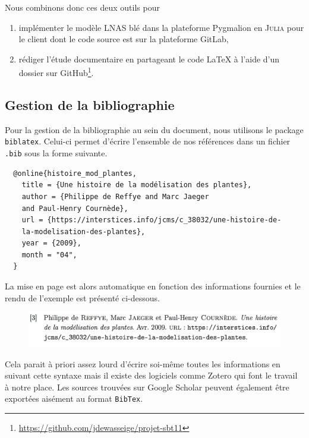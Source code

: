Nous combinons donc ces deux outils pour 
\begin{enumerate}
  \item implémenter le modèle LNAS blé dans la plateforme
  Pygmalion en \textsc{Julia} %
  pour le client dont le code source est sur la plateforme GitLab,
  \item rédiger l'étude documentaire en partageant le code \LaTeX{}
  à l'aide d'un dossier sur 
  GitHub\footnote{\url{https://github.com/jdewasseige/projet-sbt11}}.
\end{enumerate}


\subsection{Gestion de la bibliographie}
Pour la gestion de la bibliographie au sein du document,
nous utilisons le package \texttt{biblatex}.
Celui-ci permet d'écrire l'ensemble de nos références dans un fichier \texttt{.bib}
sous la forme suivante.
\begin{verbatim}
  @online{histoire_mod_plantes,
    title = {Une histoire de la modélisation des plantes},
    author = {Philippe de Reffye and Marc Jaeger 
    and Paul-Henry Cournède},
    url = {https://interstices.info/jcms/c_38032/une-histoire-de-
    la-modelisation-des-plantes},
    year = {2009},
    month = "04",
  }
\end{verbatim}
La mise en page est alors automatique en fonction des informations fournies
et le rendu de l'exemple est présenté ci-dessous.
\begin{figure}[h]
  \includegraphics[scale=0.6]{./img/rendu_elem_bib.jpg}
\end{figure}

Cela parait à priori assez lourd d'écrire soi-même toutes les informations
en suivant cette syntaxe mais il existe des logiciels comme Zotero
qui font le travail à notre place.
Les sources trouvées sur Google Scholar peuvent également être exportées
aisément au format \texttt{BibTex}.

